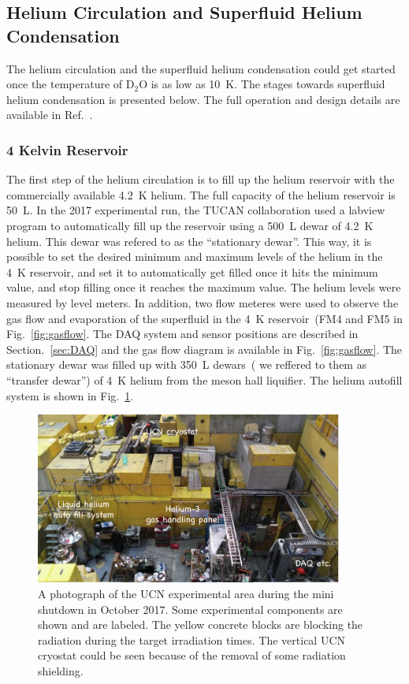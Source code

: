 \subsection{Helium Circulation and Superfluid Helium Condensation}
The helium circulation and the superfluid helium condensation could
get started once the temperature of D$_2$O is as low as 10~K. The
stages towards superfluid helium condensation is presented below. The
full operation and design details are available in
Ref.~\cite{matsumiya_thesis}.

\subsubsection{4 Kelvin Reservoir}
The first step of the helium circulation is to fill up the helium
reservoir with the commercially available 4.2~K helium. The full
capacity of the helium reservoir is 50~L. In the 2017 experimental
run, the TUCAN collaboration used a labview program to automatically
fill up the reservoir using a 500~L dewar of 4.2~K helium. This dewar
was refered to as the ``stationary dewar''. This way, it is possible
to set the desired minimum and maximum levels of the helium in the 4~K
reservoir, and set it to automatically get filled once it hits the
minimum value, and stop filling once it reaches the maximum value. The
helium levels were measured by level meters. In addition, two flow
meteres were used to observe the gas flow and evaporation of the
superfluid in the 4~K reservoir~(FM4 and FM5 in
Fig.~\ref{fig:gasflow}. The DAQ system and sensor positions are
described in Section.~\ref{sec:DAQ} and the gas flow diagram is
available in Fig.~\ref{fig:gasflow}. The stationary dewar was filled
up with 350~L dewars~( we reffered to them as ``transfer dewar'') of
4~K helium from the meson hall liquifier. The helium autofill system
is shown in Fig.~\ref{fig:ucnarea}.

\begin{figure}[h!]
  \centering
  \includegraphics[width=0.9\textwidth]{ucnarea.png}
  \caption{A photograph of the UCN experimental area during the mini
    shutdown in October 2017. Some experimental components are shown
    and are labeled. The yellow concrete blocks are blocking the
    radiation during the target irradiation times. The vertical UCN
    cryostat could be seen because of the removal of some radiation
    shielding. }
  \label{fig:ucnarea}
\end{figure}


